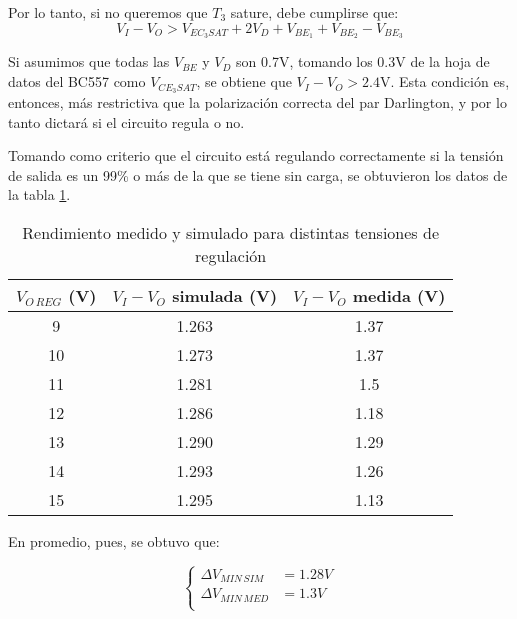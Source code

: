 \documentclass[e2_tp1_main.tex]{subfiles}
\begin{document}
Por lo tanto, si no queremos que $T_3$ sature, debe cumplirse que:
\begin{equation}
	  V_I - V_O > V_{EC_3 SAT} + 2V_D +  V_{BE_1} +  V_{BE_2} -  V_{BE_3}
\end{equation}

Si asumimos que todas las $V_{BE}$ y $V_D$ son 0.7V, tomando los 0.3V de la hoja de datos del BC557 como $V_{CE_3 SAT}$, se obtiene que $V_I - V_O > 2.4$V. Esta condici\'on es, entonces, m\'as restrictiva que la polarizaci\'on correcta del par Darlington, y por lo tanto dictar\'a si el circuito regula o no.

Tomando como criterio que el circuito est\'a regulando correctamente si la tensi\'on de salida es un 99\% o m\'as de la que se tiene sin carga, se obtuvieron los datos de la tabla \ref{table:rendimiento}.

\begin{table}[htb!]
\centering
\begin{tabular}{|c||c|c|}
\hline
$V_{O\,REG}$ (V) & $V_I - V_O$ simulada (V) & $V_I - V_O$ medida (V) \\ \hline\hline
9                & 1.263                    & 1.37                   \\ \hline
10               & 1.273                    & 1.37                   \\ \hline
11               & 1.281                    & 1.5                    \\ \hline
12               & 1.286                    & 1.18                   \\ \hline
13               & 1.290                    & 1.29                   \\ \hline
14               & 1.293                    & 1.26                   \\ \hline
15               & 1.295                    & 1.13                   \\ \hline
\end{tabular}
\caption{Rendimiento medido y simulado para distintas tensiones de regulaci\'on}
\label{table:rendimiento}
\end{table}

En promedio, pues, se obtuvo que:

\begin{equation}
	\left\{
	\begin{aligned}
	\Delta V_{MIN\,SIM} &= 1.28V \\ 
	\Delta V_{MIN\,MED} &= 1.3V \\ 
	\end{aligned}
	\right.
\end{equation}
\end{document}
